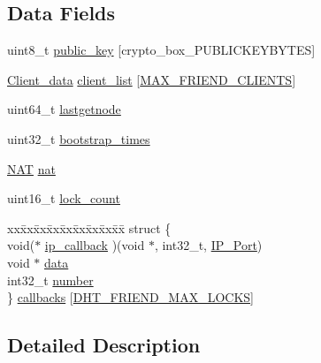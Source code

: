 \subsection*{Data Fields}
\begin{DoxyCompactItemize}
\item 
uint8\+\_\+t \hyperlink{struct_d_h_t___friend_aaa806bb1136fb3d4b5d8d8970b596ff7}{public\+\_\+key} \mbox{[}crypto\+\_\+box\+\_\+\+P\+U\+B\+L\+I\+C\+K\+E\+Y\+B\+Y\+T\+E\+S\mbox{]}
\item 
\hyperlink{struct_client__data}{Client\+\_\+data} \hyperlink{struct_d_h_t___friend_a49ef2b640a834a77b6e123355a4fea47}{client\+\_\+list} \mbox{[}\hyperlink{_d_h_t_8h_ad50d158518277ca4d19cbe364f3e958c}{M\+A\+X\+\_\+\+F\+R\+I\+E\+N\+D\+\_\+\+C\+L\+I\+E\+N\+T\+S}\mbox{]}
\item 
uint64\+\_\+t \hyperlink{struct_d_h_t___friend_acdb8d1d26f42ba99ca73f45cb5643d1e}{lastgetnode}
\item 
uint32\+\_\+t \hyperlink{struct_d_h_t___friend_aae62716bf77c5ba5fca784702d47a5ff}{bootstrap\+\_\+times}
\item 
\hyperlink{struct_n_a_t}{N\+A\+T} \hyperlink{struct_d_h_t___friend_a96318690475243d010825feb2a67b41c}{nat}
\item 
uint16\+\_\+t \hyperlink{struct_d_h_t___friend_a712c4c639bfc0f5a8616eead3e24ca4e}{lock\+\_\+count}
\item 
\begin{tabbing}
xx\=xx\=xx\=xx\=xx\=xx\=xx\=xx\=xx\=\kill
struct \{\\
\>void($\ast$ \hyperlink{struct_d_h_t___friend_abc638e20365d8487c7bc56894c5ef969}{ip\_callback} )(void $\ast$, int32\_t, \hyperlink{struct_i_p___port}{IP\_Port})\\
\>void $\ast$ \hyperlink{struct_d_h_t___friend_a735984d41155bc1032e09bece8f8d66d}{data}\\
\>int32\_t \hyperlink{struct_d_h_t___friend_a875e6b85754551c9eaea424a5a4c7934}{number}\\
\} \hyperlink{struct_d_h_t___friend_a1ef2d93ffeb76ceb01d28ecb1244547c}{callbacks} \mbox{[}\hyperlink{_d_h_t_8h_a5a2a8d3d5ad30ebd3efec91f27ccf394}{DHT\_FRIEND\_MAX\_LOCKS}\mbox{]}\\

\end{tabbing}\end{DoxyCompactItemize}


\subsection{Detailed Description}


